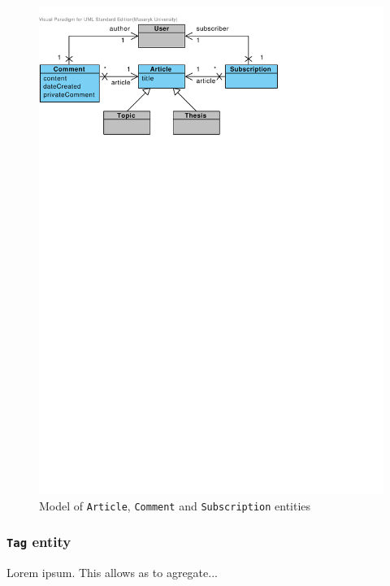 \begin{figure}[h]
    \centering
        \includegraphics[trim=0 620 180 30, clip, keepaspectratio, width=\textwidth]{./images/domain-article-comment-subscription-entities.pdf}
    \caption{Model of \texttt{Article}, \texttt{Comment} and \texttt{Subscription} entities}
    \label{fig:domain-article-comment-subscription-entities}
\end{figure}

\subsubsection{\texttt{Tag} entity}

Lorem ipsum. This allows as to agregate...

